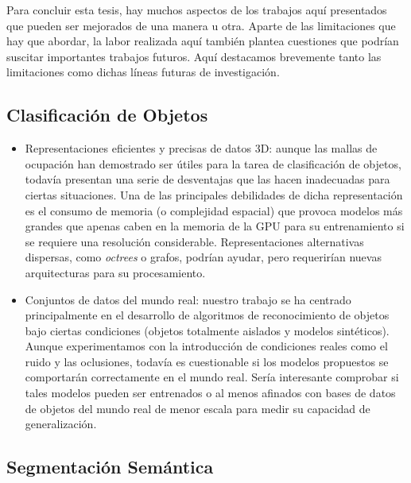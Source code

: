Para concluir esta tesis, hay muchos aspectos de los trabajos aquí presentados que pueden ser mejorados de una manera u otra. Aparte de las limitaciones que hay que abordar, la labor realizada aquí también plantea cuestiones que podrían suscitar importantes trabajos futuros. Aquí destacamos brevemente tanto las limitaciones como dichas líneas futuras de investigación.

\subsection{Clasificación de Objetos}

\begin{itemize}
    \item Representaciones eficientes y precisas de datos 3D: aunque las mallas de ocupación han demostrado ser útiles para la tarea de clasificación de objetos, todavía presentan una serie de desventajas que las hacen inadecuadas para ciertas situaciones. Una de las principales debilidades de dicha representación es el consumo de memoria (o complejidad espacial) que provoca modelos más grandes que apenas caben en la memoria de la \ac{GPU} para su entrenamiento si se requiere una resolución considerable. Representaciones alternativas dispersas, como \emph{octrees} o grafos, podrían ayudar, pero requerirían nuevas arquitecturas para su procesamiento.
    \item Conjuntos de datos del mundo real: nuestro trabajo se ha centrado principalmente en el desarrollo de algoritmos de reconocimiento de objetos bajo ciertas condiciones (objetos totalmente aislados y modelos sintéticos). Aunque experimentamos con la introducción de condiciones reales como el ruido y las oclusiones, todavía es cuestionable si los modelos propuestos se comportarán correctamente en el mundo real. Sería interesante comprobar si tales modelos pueden ser entrenados o al menos afinados con bases de datos de objetos del mundo real de menor escala para medir su capacidad de generalización.
\end{itemize}

\subsection{Segmentación Semántica}

